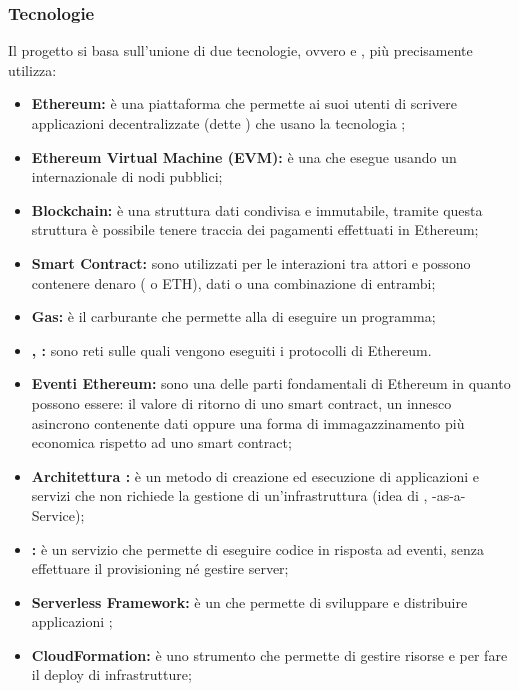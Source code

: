     \subsubsection{Tecnologie}
     Il progetto si basa sull'unione di due tecnologie, ovvero  e , più precisamente utilizza:
    		 \begin{itemize}
    			\item \textbf{Ethereum: }è una piattaforma che permette ai suoi utenti di scrivere applicazioni decentralizzate (dette ) che usano la tecnologia ;
    			\item \textbf{Ethereum Virtual Machine (EVM): }è una  che esegue  usando un  internazionale di nodi pubblici;
    			\item \textbf{Blockchain: }è una struttura dati condivisa e immutabile, tramite questa struttura è possibile tenere traccia dei pagamenti effettuati in Ethereum;
    			\item \textbf{Smart Contract: }sono utilizzati per le interazioni tra attori e possono contenere denaro ( o ETH), dati o una combinazione di entrambi;
    			\item \textbf{Gas: }è il carburante che permette alla  di eseguire un programma;
    		 	\item \textbf{, : }sono reti sulle quali vengono eseguiti i protocolli di Ethereum.
    		 	\item \textbf{Eventi Ethereum: }sono una delle parti fondamentali di Ethereum in quanto possono essere: il  valore di ritorno di uno smart contract, un innesco asincrono contenente dati oppure una forma di  immagazzinamento più economica rispetto ad uno smart contract;
    			 \item \textbf{Architettura : }è un metodo di creazione ed esecuzione di applicazioni e servizi che non richiede la gestione di un'infrastruttura (idea di , -as-a-Service);
    		 	\item \textbf{: }è un servizio che permette di eseguire codice  in risposta ad eventi, senza effettuare il provisioning né gestire server;
    		 	\item \textbf{Serverless Framework: }è un   che permette di sviluppare e distribuire applicazioni ;
    		 	\item \textbf{CloudFormation: }è uno strumento che permette di gestire risorse e per fare il deploy di infrastrutture;

\end{itemize}
